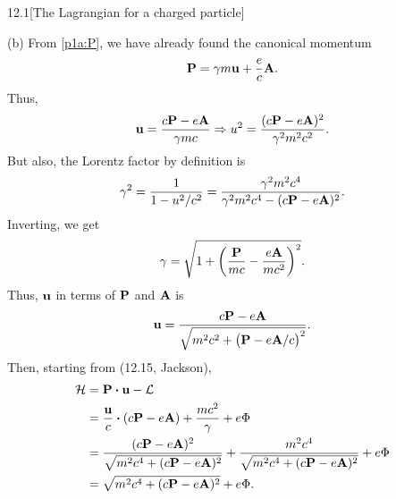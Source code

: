 \documentclass[12pt]{article}
\begin{document}
\begin{problem}{12.1}[The Lagrangian for a charged particle]
\begin{solution}
(b) From \eqref{p1a:P}, we have already found the canonical momentum
\begin{equation}
    \vb{P}=\gamma m\vb{u}+\frac{e}{c}\vb{A}. 
\end{equation}
Thus,
\begin{equation}
    \vb{u}=\frac{c\vb{P}-e\vb{A}}{\gamma mc}
    \Rightarrow u^2=\frac{(c\vb{P}-e\vb{A})^2}{\gamma^2m^2c^2}.
\end{equation}
But also, the Lorentz factor by definition is
\begin{equation}
    \gamma^2=\frac{1}{1-u^2/c^2}=\frac{\gamma^2m^2c^4}{\gamma^2m^2c^4-(c\vb{P}-e\vb{A})^2}.
\end{equation}
Inverting, we get
\begin{equation}
    \gamma=\sqrt{1+\qty(\frac{\vb{P}}{mc}-\frac{e\vb{A}}{mc^2})^2}. 
\end{equation}
Thus, $\vb{u}$ in terms of $\vb{P}$ and $\vb{A}$ is
\begin{equation}
    \vb{u}=\frac{c\vb{P}-e\vb{A}}{\sqrt{m^2c^2+\qty(\vb{P}-e\vb{A}/c)^2}}.
\end{equation}
Then, starting from (12.15, Jackson),
\begin{align}
    \HH
    &=\vb{P}\vdot\vb{u}-\LL\notag\\
    &=\frac{\vb{u}}{c}\vdot\qty(c\vb{P}-e\vb{A})+\frac{mc^2}{\gamma}+e\Phi\notag\\
    &=\frac{(c\vb{P}-e\vb{A})^2}{\sqrt{m^2c^4+(c\vb{P}-e\vb{A})^2}}
    +\frac{m^2c^4}{\sqrt{m^2c^4+(c\vb{P}-e\vb{A})^2}}+e\Phi\notag\\
    &=\sqrt{m^2c^4+(c\vb{P}-e\vb{A})^2}+e\Phi.
\end{align}

\end{solution}
\end{problem}
\newpage
\end{document}
